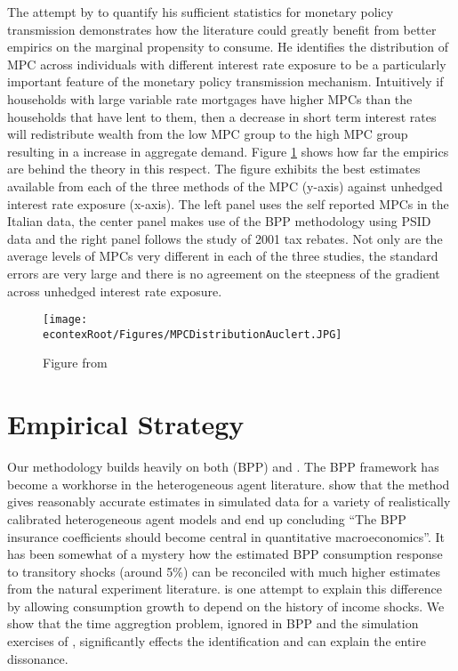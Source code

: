 \documentclass[titlepage]{\econtex}\newcommand{\texname}{IncomeUncertainty}
\begin{document}
The attempt by \cite{auclert_monetary_2015} to quantify his sufficient statistics for monetary policy transmission demonstrates how the literature could greatly benefit from better empirics on the marginal propensity to consume. He identifies the distribution of MPC across individuals with different interest rate exposure to be a particularly important feature of the monetary policy transmission mechanism. Intuitively if households with large variable rate mortgages have higher MPCs than the households that have lent to them, then a decrease in short term interest rates will redistribute wealth from the low MPC group to the high MPC group resulting in a increase in aggregate demand. Figure \ref{fig:Auclert} shows how far the empirics are behind the theory in this respect. The figure exhibits the best estimates available from each of the three methods of the MPC (y-axis) against unhedged interest rate exposure (x-axis). The left panel uses the self reported MPCs in the Italian data, the center panel makes use of the BPP methodology using PSID data and the right panel follows the \cite{johnson_household_2006} study of 2001 tax rebates. Not only are the average levels of MPCs very different in each of the three studies, the standard errors are very large and there is no agreement on the steepness of the gradient across unhedged interest rate exposure.
	\begin{figure} 
	\begin{centering}
	\texttt{[image: \\econtexRoot/Figures/MPCDistributionAuclert.JPG]}
	\caption{Figure from \cite{auclert_monetary_2015}}
	\label{fig:Auclert}
	\end{centering}
	\end{figure}

\section{Empirical Strategy} \label{empirical_strategy}
Our methodology builds heavily on both \cite{blundell_consumption_2008} (BPP) and \cite{carroll_nature_1997}. The BPP framework has become a workhorse in the heterogeneous agent literature. \cite{kaplan_how_2010} show that the method gives reasonably accurate estimates in simulated data for a variety of realistically calibrated heterogeneous agent models and end up concluding ``The BPP insurance coefficients should become central in quantitative macroeconomics''. It has been somewhat of a mystery how the estimated BPP consumption response to transitory shocks (around 5\%) can be reconciled with much higher estimates from the natural experiment literature. \cite{commault_how_2017} is one attempt to explain this difference by allowing consumption growth to depend on the history of income shocks. We show that the time aggregtion problem, ignored in BPP and the simulation exercises of \cite{kaplan_how_2010}, significantly effects the identification and can explain the entire dissonance.
\end{document}
